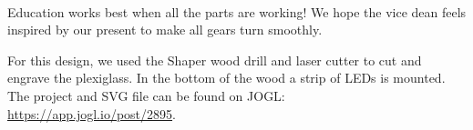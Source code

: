 \documentclass{report}
\begin{document}
 \\

Education works best when all the parts are working! We hope the vice dean feels inspired by our present to make all gears turn smoothly. 

For this design, we used the Shaper wood drill and laser cutter to cut and engrave the plexiglass. In the bottom of the wood a strip of LEDs is mounted.
The project and SVG file can be found on JOGL:\\
\url{https://app.jogl.io/post/2895}.

\clearpage
\begin{figure}
    \centering
\end{figure}
\clearpage
\end{document}
